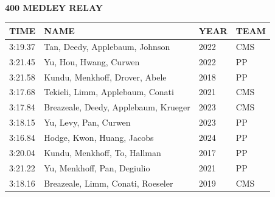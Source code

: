 \begin{table}[H]
\centering
\begin{minipage}[t]{0.6\textwidth}
\centering
\textbf{400 MEDLEY RELAY}\\[0.1cm]
\begin{tabular}{@{}p{1.8cm}p{2.8cm}p{1.2cm}p{1.4cm}@{}}
\hline
    \textbf{TIME} & \textbf{NAME} & \textbf{YEAR} & \textbf{TEAM} \\
\hline
    3:19.37 & Tan, Deedy, Applebaum, Johnson & 2022 & CMS \\
    3:21.45 & Yu, Hou, Hwang, Curwen & 2022 & PP \\
    3:21.58 & Kundu, Menkhoff, Drover, Abele & 2018 & PP \\
    3:17.68 & Tekieli, Limm, Applebaum, Conati & 2021 & CMS \\
    3:17.84 & Breazeale, Deedy, Applebaum, Krueger & 2023 & CMS \\
    3:18.15 & Yu, Levy, Pan, Curwen & 2023 & PP \\
    3:16.84 & Hodge, Kwon, Huang, Jacobs & 2024 & PP \\
    3:20.04 & Kundu, Menkhoff, To, Hallman & 2017 & PP \\
    3:21.22 & Yu, Menkhoff, Pan, Degiulio & 2021 & PP \\
    3:18.16 & Breazeale, Limm, Conati, Roeseler & 2019 & CMS \\
\hline
\end{tabular}
\end{minipage}
\end{table}


\newpage


